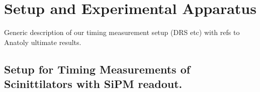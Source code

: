 \section{Setup and Experimental Apparatus }
\label{sec:tbeam}

Generic description of our timing measurement setup (DRS etc) with refs to Anatoly ultimate results.



\subsection{Setup for Timing Measurements of Scinittilators with SiPM readout.}
